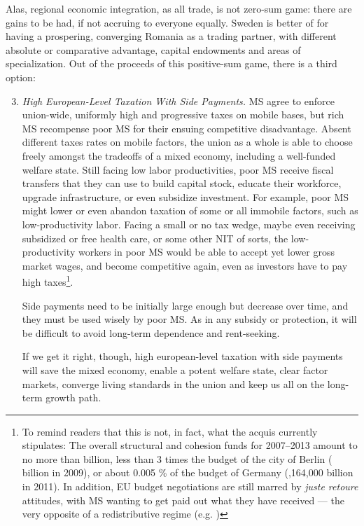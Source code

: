 \documentclass[11pt,a4paper,oneside,openright]{article}
\begin{document}
Alas, regional economic integration, as all trade, is not zero-sum game: there are gains to be had, if not accruing to everyone equally. Sweden is better of for having a prospering, converging Romania as a trading partner, with different absolute or comparative advantage, capital endowments and areas of specialization. Out of the proceeds of this positive-sum game, there is a third option:
\begin{enumerate}
	\setcounter{enumi}{2}
	\item \emph{High European-Level Taxation With Side Payments.} \gls{MS} agree to enforce union-wide, uniformly high and progressive taxes on mobile bases, but rich \gls{MS} recompense poor \gls{MS} for their ensuing competitive disadvantage. Absent different taxes rates on mobile factors, the union as a whole is able to choose freely amongst the tradeoffs of a mixed economy, including a well-funded welfare state. Still facing low labor productivities, poor \gls{MS} receive fiscal transfers that they can use to build capital stock, educate their workforce, upgrade infrastructure, or even subsidize investment. For example, poor \gls{MS} might lower or even abandon taxation of some or all immobile factors, such as low-productivity labor. Facing a small or no tax wedge, maybe even receiving subsidized or free health care, or some other \gls{NIT} of sorts, the low-productivity workers in poor \gls{MS} would be able to accept yet lower gross market wages, and become competitive again, even as investors have to pay high taxes\footnote{
		To remind readers that this is not, in fact, what the acquis currently stipulates: The overall structural and cohesion funds for 2007--2013 amount to no more than  billion, less than 3 times the budget of the city of Berlin ( billion in 2009), or about 0.005 \% of the budget of Germany (,164,000 billion in 2011). In addition, \gls{EU} budget negotiations are still marred by \emph{juste retoure} attitudes, with \gls{MS} wanting to get paid out what they have received --- the very opposite of a redistributive regime (e.g. \citealt{Begg2008a})}.
	
	Side payments need to be initially large enough but decrease over time, and they must be used wisely by poor \gls{MS}. As in any subsidy or  protection, it will be difficult to avoid long-term dependence and rent-seeking.
	
	If we get it right, though, high european-level taxation with side payments will save the mixed economy, enable a potent welfare state, clear factor markets, converge living standards in the union and keep us all on the long-term growth path. 
\end{enumerate}
\end{document}
